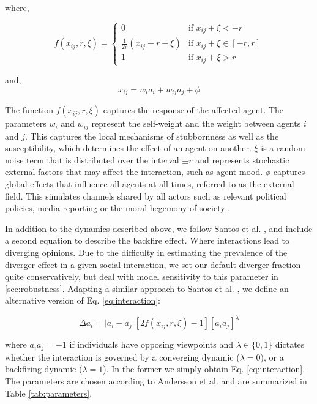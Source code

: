 \documentclass[unnumsec,webpdf,contemporary,large]{oup-authoring-template}%
\theoremstyle{thmstyleone}%
\theoremstyle{thmstyletwo}%
\theoremstyle{thmstylethree}%
\begin{document}
where,

\begin{equation}
    f(x_{ij},r,\xi) =
    \begin{cases}
    0                           & \text{if $x_{ij}+\xi < -r$}\\
    \frac{1}{2r}(x_{ij}+r-\xi)         & \text{if $x_{ij}+\xi \in [-r,r] $}\\
    1                           & \text{if $x_{ij}+\xi > r$}
    \end{cases}
\end{equation}

and,
\begin{equation}
    x_{ij} = w_i a_i + w_{ij} a_j + \phi
\end{equation}

The function \(f(x_{ij},r,\xi)\) captures the response of the affected agent. The parameters \(w_i\) and \(w_{ij}\) represent the self-weight and the weight between agents \(i\) and \(j\). This captures the local mechanisms of stubbornness as well as the susceptibility, which determines the effect of an agent on another. \(\xi\) is a random noise term that is distributed over the interval \(\pm r\) and represents stochastic external factors that may affect the interaction, such as agent mood. \(\phi\) captures global effects that influence all agents at all times, referred to as the external field. This simulates channels shared by all actors such as relevant political policies, media reporting or the moral hegemony of society \citep{andersson_simple_2020}.

In addition to the dynamics described above, we follow Santos et al. \cite{santos_link_2021}, and include a second equation to describe the backfire effect. Where interactions lead to diverging opinions. Due to the difficulty in estimating the prevalence of the diverger effect in a given social interaction, we set our default diverger fraction quite conservatively, but deal with model sensitivity to this parameter in \ref{sec:robustness}. Adapting a similar approach to Santos et al. \cite{santos_link_2021}, we define an alternative version of Eq. \ref{eq:interaction}:

\begin{equation}
\Delta a_i = \lvert a_i - a_j \rvert \left[ 2f(x_{ij}, r, \xi) - 1 \right] [ a_i a_j ]^\lambda
\end{equation}

where \(a_i a_j = -1\) if individuals have opposing viewpoints and \(\lambda \in \{0,1\}\) dictates whether the interaction is governed by a converging dynamic ($\lambda = 0$), or a backfiring dynamic ($\lambda = 1$). In the former we simply obtain Eq. \ref{eq:interaction}. The parameters are chosen according to Andersson et al. \citep{andersson_dynamics_2021} and are summarized in Table \ref{tab:parameters}.
\end{document}
